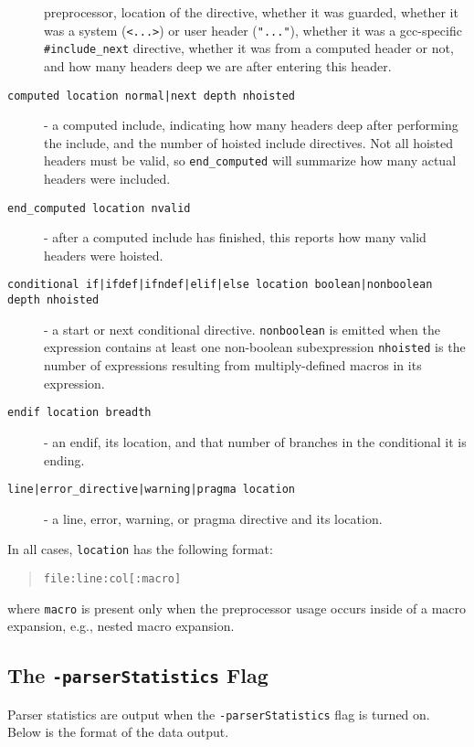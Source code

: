 \documentclass{article}
\begin{document}
\begin{description}
  preprocessor, location of the directive, whether it was guarded,
  whether it was a system (\verb"<...>") or user header
  (\verb'"..."'), whether it was a gcc-specific \verb"#include_next"
  directive, whether it was from a computed header or not, and how
  many headers deep we are after entering this header.
\item[\texttt{computed location normal|next depth nhoisted}] - a computed
  include, indicating how many headers deep after performing the
  include, and the number of hoisted include directives.  Not all
  hoisted headers must be valid, so \verb"end_computed" will summarize how
  many actual headers were included.
\item[\texttt{end\_computed location nvalid}] - after a computed include has
  finished, this reports how many valid headers were hoisted.
\item[\texttt{conditional if|ifdef|ifndef|elif|else location
  boolean|nonboolean depth nhoisted}] - a start or next conditional
  directive. \verb"nonboolean" is emitted when the expression contains at
  least one non-boolean subexpression \verb"nhoisted" is the number of
  expressions resulting from multiply-defined macros in its
  expression.
\item[\texttt{endif location breadth}] - an endif, its location, and that
  number of branches in the conditional it is ending.
\item[\texttt{line|error\_directive|warning|pragma location}] - a line, error, warning,
  or pragma directive and its location.
\end{description}

In all cases, \verb"location" has the following format:

\begin{quote}
\verb"file:line:col[:macro]"
\end{quote}

where \verb"macro" is present only when the preprocessor usage occurs
inside of a macro expansion, e.g., nested macro expansion.

\subsection{The \texttt{-parserStatistics} Flag}

Parser statistics are output when the \verb"-parserStatistics" flag is
turned on.  Below is the format of the data output.
\end{document}

